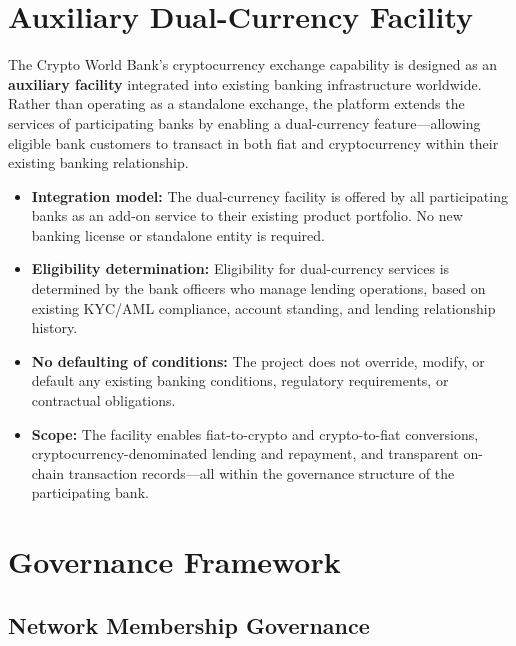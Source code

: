 \documentclass[12pt,a4paper]{report}
\begin{document}
\section{Auxiliary Dual-Currency Facility}

The Crypto World Bank's cryptocurrency exchange capability is designed as an \textbf{auxiliary facility} integrated into existing banking infrastructure worldwide. Rather than operating as a standalone exchange, the platform extends the services of participating banks by enabling a dual-currency feature---allowing eligible bank customers to transact in both fiat and cryptocurrency within their existing banking relationship.

\begin{itemize}[noitemsep]
\item \textbf{Integration model:} The dual-currency facility is offered by all participating banks as an add-on service to their existing product portfolio. No new banking license or standalone entity is required.
\item \textbf{Eligibility determination:} Eligibility for dual-currency services is determined by the bank officers who manage lending operations, based on existing KYC/AML compliance, account standing, and lending relationship history.
\item \textbf{No defaulting of conditions:} The project does not override, modify, or default any existing banking conditions, regulatory requirements, or contractual obligations.
\item \textbf{Scope:} The facility enables fiat-to-crypto and crypto-to-fiat conversions, cryptocurrency-denominated lending and repayment, and transparent on-chain transaction records---all within the governance structure of the participating bank.
\end{itemize}


\section{Governance Framework}

\subsection{Network Membership Governance}
\end{document}
